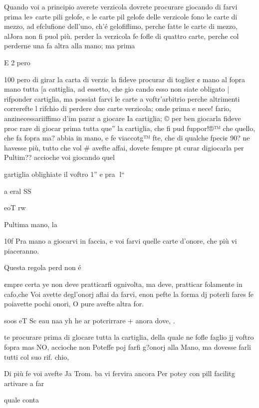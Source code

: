 \documentclass[12pt,a6paper]{article}
\begin{document}
Quando voi a principio averete verzicola dovrete procurare giocando di farvi prima le»
carte pili gelofe, e le carte pil
gelofe delle verzicole fono le
carte di mezzo, ad efclufione
dell’uno, ch’é gelofiflimo, perche fatte le carte di mezzo, alJora non fi puol più. perder la
verzicola fe fofle di quattro carte, perche col perderne una
fa altra alla mano; ma prima

E 2 pero

 

 
 

 

 

 

100
pero di girar la carta di verzic
la fideve procurar di toglier ¢
mano al fopra mano tutta [a
cattiglia, ad essetto, che gio
cando esso non siate obligato |
rifponder cartiglia, ma possiat
farvi le carte a voftr’arbitrio
perche altrimenti correrefte l
rifchio di perdere due carte
verzicola; onde prima e nece!
fario, anzinecessariiffimo d’im
parar a giocare Ia cartiglia; ©
per ben giocarla fideve proc
rare di giocar prima tutta que”
la cartiglia, che fi pud fuppor!®™
che quello, che fa fopra ma?
abbia in mano, e fe viaccotg™
fte, che di qualche fpeci¢ 90?
ne havesse più, tutto che vol #
avefte affai, dovete fempre pt
curar digiocarla per Pultim??
accioche voi giocando quel

gartiglia oblighiate il voftro 1”
e pra
l“

a eral SS

eoT rw

Pultima mano, la

10f
Pra mano a giocarvi in faccia,
e voi farvi quelle carte d’onore,
che più vi piaceranno.

Questa regola perd non é

¢mpre certa ye non deve pratticarfi ognivolta, ma deve,
pratticar folamente in cafo,che
Voi avette degl’onorj aflai da
farvi, enon pefte la forma dj
poterli fares fe poiavette pochi
onori, O pure avefte altra for.

soos eT Sc eau naa yh
he ar potcrirrare + anora dove, .

te procurare prima di glocare
tutta la cartiglia, della quale ne
fofle faglio jj voftro fopra mas
NO, accioche non Poteffe poj
farfi g?onorj alla Mano, ma dovesse farli tutti col suo rif.
chio,

Di più fe voi avefte Ja Trom.
ba vi fervira ancora Per potey
con pill facilitg artivare a far

quale conta
\end{document}
